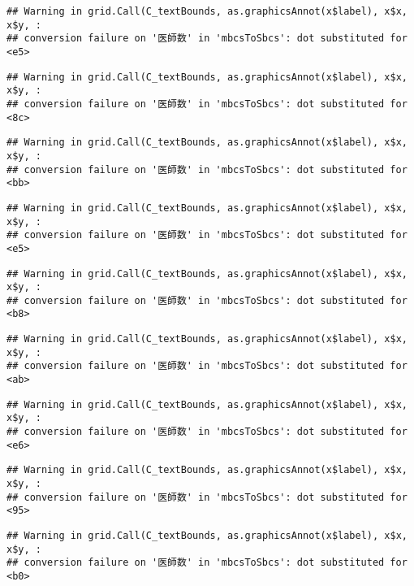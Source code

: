 \documentclass[
]{article}
\begin{document}
\begin{verbatim}
## Warning in grid.Call(C_textBounds, as.graphicsAnnot(x$label), x$x, x$y, :
## conversion failure on '医師数' in 'mbcsToSbcs': dot substituted for <e5>
\end{verbatim}

\begin{verbatim}
## Warning in grid.Call(C_textBounds, as.graphicsAnnot(x$label), x$x, x$y, :
## conversion failure on '医師数' in 'mbcsToSbcs': dot substituted for <8c>
\end{verbatim}

\begin{verbatim}
## Warning in grid.Call(C_textBounds, as.graphicsAnnot(x$label), x$x, x$y, :
## conversion failure on '医師数' in 'mbcsToSbcs': dot substituted for <bb>
\end{verbatim}

\begin{verbatim}
## Warning in grid.Call(C_textBounds, as.graphicsAnnot(x$label), x$x, x$y, :
## conversion failure on '医師数' in 'mbcsToSbcs': dot substituted for <e5>
\end{verbatim}

\begin{verbatim}
## Warning in grid.Call(C_textBounds, as.graphicsAnnot(x$label), x$x, x$y, :
## conversion failure on '医師数' in 'mbcsToSbcs': dot substituted for <b8>
\end{verbatim}

\begin{verbatim}
## Warning in grid.Call(C_textBounds, as.graphicsAnnot(x$label), x$x, x$y, :
## conversion failure on '医師数' in 'mbcsToSbcs': dot substituted for <ab>
\end{verbatim}

\begin{verbatim}
## Warning in grid.Call(C_textBounds, as.graphicsAnnot(x$label), x$x, x$y, :
## conversion failure on '医師数' in 'mbcsToSbcs': dot substituted for <e6>
\end{verbatim}

\begin{verbatim}
## Warning in grid.Call(C_textBounds, as.graphicsAnnot(x$label), x$x, x$y, :
## conversion failure on '医師数' in 'mbcsToSbcs': dot substituted for <95>
\end{verbatim}

\begin{verbatim}
## Warning in grid.Call(C_textBounds, as.graphicsAnnot(x$label), x$x, x$y, :
## conversion failure on '医師数' in 'mbcsToSbcs': dot substituted for <b0>
\end{verbatim}
\end{document}
